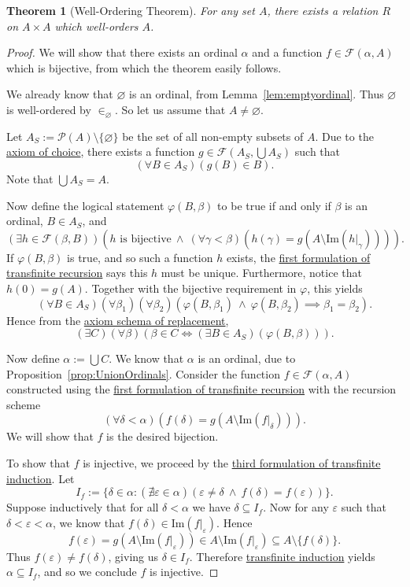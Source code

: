 \documentclass[a4paper,11pt]{article}
\theoremstyle{plain}
\newtheorem{thm}{Theorem}[subsection]
\theoremstyle{definition}
\theoremstyle{remark}
\begin{document}
\begin{thm}[Well-Ordering Theorem]
\label{thm:WellOrderingTheorem}
For any set $A$, there exists a relation $R$ on $A \times A$ which well-orders $A$.
\end{thm}
\begin{proof}
We will show that there exists an ordinal $\alpha$ and a function $f \in \mathscr F(\alpha, A)$ which is bijective, from which the theorem easily follows.

We already know that $\varnothing$ is an ordinal, from Lemma~\ref{lem:emptyordinal}. Thus $\varnothing$ is well-ordered by $\in_\varnothing$. So let us assume that $A \neq \varnothing$. 

Let $A_S := \mathscr P(A) \setminus \{\varnothing\}$ be the set of all non-empty subsets of $A$.
Due to the \hyperref[axiom:choice]{axiom of choice}, there exists a function $g \in \mathscr F(A_S, \bigcup A_S)$ such that 
\[(\forall B \in A_S)(g(B) \in B).\]
Note that $\bigcup A_S = A$. 

Now define the logical statement $\varphi(B,\beta)$ to be true if and only if $\beta$ is an ordinal, $B \in A_S$, and
\[\left(\exists h \in \mathscr F(\beta, B)\right)(h \text{ is bijective} \ \land \ (\forall \gamma < \beta)(h(\gamma) = g(A \setminus \mathrm{Im}(h|_\gamma)))).\]
If $\varphi(B,\beta)$ is true, and so such a function $h$ exists, the \hyperref[thm:Trecursion1]{first formulation of transfinite recursion} says this $h$ must be unique. Furthermore, notice that $h(0) = g(A)$. Together with the bijective requirement in $\varphi$, this yields
\[(\forall B\in A_S)(\forall \beta_1)(\forall \beta_2)(\varphi(B, \beta_1) \ \land \ \varphi(B,\beta_2) \implies \beta_1 = \beta_2).\]
Hence from the \hyperref[axiom:replacement]{axiom schema of replacement},
\[(\exists C)(\forall \beta)(\beta \in C \iff (\exists B \in A_S)(\varphi(B,\beta))).\]

Now define $\alpha := \bigcup C$. We know that $\alpha$ is an ordinal, due to Proposition~\ref{prop:UnionOrdinals}. Consider the function $f \in \mathscr F(\alpha, A)$ constructed using the \hyperref[thm:Trecursion1]{first formulation of transfinite recursion} with the recursion scheme
\[(\forall \delta < \alpha)(f(\delta) = g(A \setminus \mathrm{Im}(f|_\delta))).\]
We will show that $f$ is the desired bijection. 

To show that $f$ is injective, we proceed by the \hyperref[thm:Tinduction3]{third formulation of transfinite induction}. Let
\[I_f := \{\delta\in\alpha : (\nexists \varepsilon\in\alpha)(\varepsilon \neq \delta \ \land \ f(\delta) = f(\varepsilon))\}.\]
Suppose inductively that for all $\delta < \alpha$ we have $\delta \subseteq I_f$. Now for any $\varepsilon$ such that $\delta < \varepsilon < \alpha$, we know that $f(\delta) \in \mathrm{Im}(f|_\varepsilon)$. Hence \[f(\varepsilon) = g(A\setminus\mathrm{Im}(f|_\varepsilon)) \in A\setminus\mathrm{Im}(f|_\varepsilon) \subseteq A\setminus\{f(\delta)\}.\]
Thus $f(\varepsilon) \neq f(\delta)$, giving us $\delta \in I_f$. Therefore \hyperref[thm:Tinduction3]{transfinite induction} yields $\alpha \subseteq I_f$, and so we conclude $f$ is injective.


\end{proof}
\end{document}
